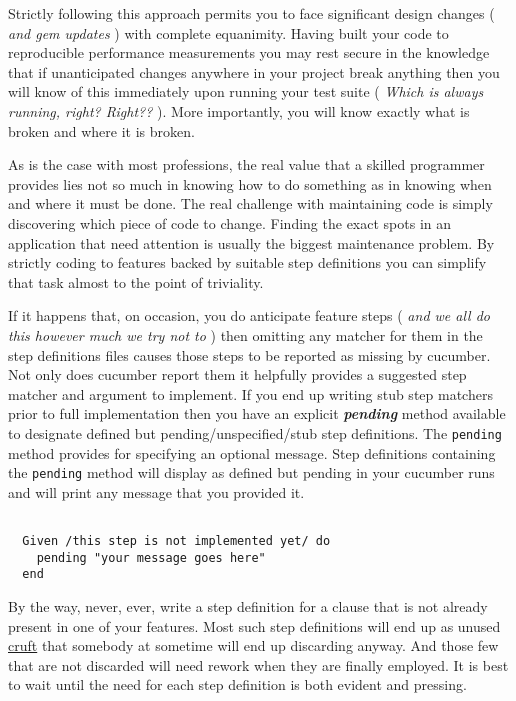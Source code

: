 Strictly following this approach permits you to face significant design changes ( \emph{and gem updates} ) with complete equanimity. Having built your code to reproducible performance measurements you may rest secure in the knowledge that if unanticipated changes anywhere in your project break anything then you will know of this immediately upon running your test suite ( \emph{Which is always running, right? Right??} ).  More importantly, you will know exactly what is broken and where it is broken.

As is the case with most professions, the real value that a skilled programmer provides lies not so much in knowing how to do something as in knowing when and where it must be done.  The real challenge with maintaining code is simply discovering which piece of code to change.  Finding the exact spots in an application that need attention is usually the biggest maintenance problem.  By strictly coding to features backed by suitable step definitions you can simplify that task almost to the point of triviality.

If it happens that, on occasion, you do anticipate feature steps ( \emph{and we all do this however much we try not to} ) then omitting any matcher for them in the step definitions files causes those steps to be reported as missing by cucumber. Not only does cucumber report them it helpfully provides a suggested step matcher and argument to implement.  If you end up writing stub step matchers prior to full implementation then you have an explicit \textbf{\emph{pending}} method available to designate defined but pending/unspecified/stub step definitions.  The \verb+pending+ method provides for specifying an optional message.  Step definitions containing the \verb+pending+ method will display as defined but pending in your cucumber runs and will print any message that you provided it.
\begin{verbatim}

  Given /this step is not implemented yet/ do
    pending "your message goes here"
  end

\end{verbatim}

By the way, never, ever, write a step definition for a clause that is not already present in one of your features.  Most such step definitions will end up as unused \href{http://en.wikipedia.org/wiki/Cruft}{cruft} that somebody at sometime will end up discarding anyway.   And those few that are not discarded will need rework when they are finally employed.  It is best to wait until the need for each step definition is both evident and pressing.

